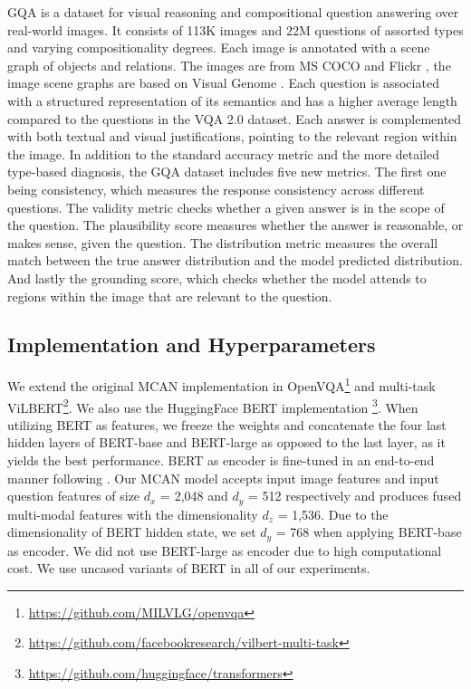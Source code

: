 \documentclass{article}
\begin{document}
GQA is a dataset \citet{hudson2019gqa} for visual reasoning and compositional question answering over real-world images. It consists of 113K images and 22M questions of assorted types and varying compositionality degrees. Each image is annotated with a scene graph of objects and relations. The images are from MS COCO \citep{coco} and Flickr \citep{thomee2016flickr}, the image scene graphs are based on Visual Genome \citep{krishnavisualgenome}. Each question is associated with a structured representation of its semantics and has a higher average length compared to the questions in the VQA 2.0 dataset. Each answer is complemented with both textual and visual justifications, pointing to the relevant region within the image. In addition to the standard accuracy metric and the more detailed type-based diagnosis, the GQA dataset includes five new metrics. The first one being consistency, which measures the response consistency across different questions. The validity metric checks whether a given answer is in the scope of the question. The plausibility score measures whether the answer is reasonable, or makes sense, given the question. The distribution metric measures the overall match between the true answer distribution and the model predicted distribution. And lastly the grounding score, which checks whether the model attends to regions within the image that are relevant to the question.

\subsection{Implementation and Hyperparameters}
We extend the original MCAN implementation in OpenVQA\footnote{\url{https://github.com/MILVLG/openvqa}} and multi-task ViLBERT\footnote{\url{https://github.com/facebookresearch/vilbert-multi-task}}. We also use the HuggingFace BERT implementation \citep{wolf2019huggingfaces}\footnote{\url{https://github.com/huggingface/transformers}}. When utilizing BERT as features, we freeze the weights and concatenate the four last hidden layers of BERT-base and BERT-large as opposed to the last layer, as it yields the best performance. BERT as encoder is fine-tuned in an end-to-end manner following \citep{devlin-etal-2019-bert}. Our MCAN model accepts input image features and input question features of size $d_{x}$ = 2,048 and $d_{y}$ = 512 respectively and produces fused multi-modal features with the dimensionality $d_{z}$ = 1,536. Due to the dimensionality of BERT hidden state, we set $d_{y}$ = 768 when applying BERT-base as encoder. We did not use BERT-large as encoder due to high computational cost. We use uncased variants of BERT in all of our experiments.
\end{document}
